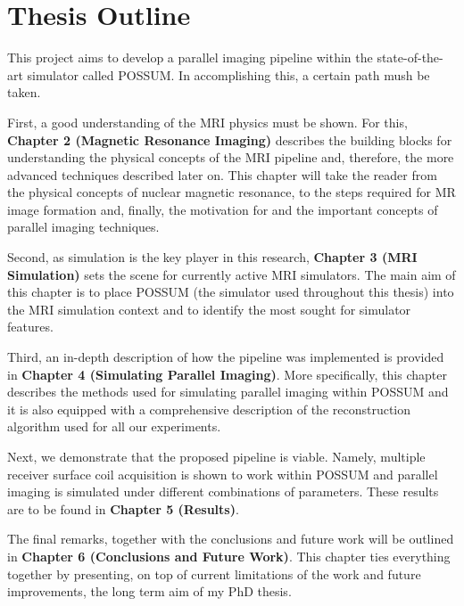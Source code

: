 \section{Thesis Outline}

This project aims to develop a parallel imaging pipeline within the state-of-the-art simulator called POSSUM. In accomplishing this, a certain path mush be taken. 

First, a good understanding of the MRI physics must be shown. For this, \textbf{Chapter 2 (Magnetic Resonance Imaging)} describes the building blocks for understanding the physical concepts of the MRI pipeline and, therefore, the more advanced techniques described later on. This chapter will take the reader from the physical concepts of nuclear magnetic resonance, to the steps required for MR image formation and, finally, the motivation for and the important concepts of parallel imaging techniques.

Second, as simulation is the key player in this research, \textbf{Chapter 3 (MRI Simulation)} sets the scene for currently active MRI simulators. The main aim of this chapter is to place POSSUM (the simulator used throughout this thesis) into the MRI simulation context and to identify the most sought for simulator features.

Third, an in-depth description of how the pipeline was implemented is provided in \textbf{Chapter 4 (Simulating Parallel Imaging)}. More specifically, this chapter describes the methods used for simulating parallel imaging within POSSUM and it is also equipped with a comprehensive description of the reconstruction algorithm used for all our experiments.

Next, we demonstrate that the proposed pipeline is viable. Namely, multiple receiver surface coil acquisition is shown to work within POSSUM and parallel imaging is simulated under different combinations of parameters. These results are to be found in \textbf{Chapter 5 (Results)}.

The final remarks, together with the conclusions and future work will be outlined in \textbf{Chapter 6 (Conclusions and Future Work)}. This chapter ties everything together by presenting, on top of current limitations of the work and future improvements, the long term aim of my PhD thesis.

